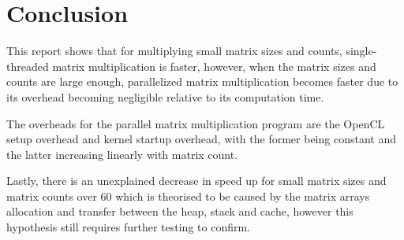 \section{Conclusion}

This report shows that for multiplying small matrix sizes and counts, single-threaded matrix multiplication is faster, however, when the matrix sizes and counts are large enough, parallelized matrix multiplication becomes faster due to its overhead becoming negligible relative to its computation time.

The overheads for the parallel matrix multiplication program are the OpenCL setup overhead and kernel startup overhead, with the former being constant and the latter increasing linearly with matrix count.

Lastly, there is an unexplained decrease in speed up for small matrix sizes and matrix counts over 60 which is theorised to be caused by the matrix arrays allocation and transfer between the heap, stack and cache, however this hypothesis still requires further testing to confirm.